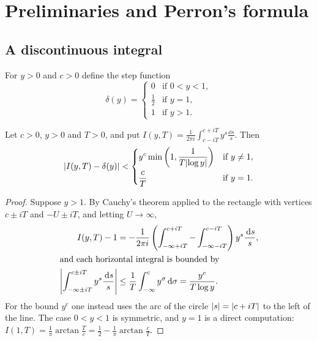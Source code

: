 \section{Preliminaries and Perron's formula}\label{sec:prelim}

\subsection{A discontinuous integral}
For $y>0$ and $c>0$ define the step function
\begin{equation}\label{eq:delta}
\delta(y) = \begin{cases}
 0 & \text{if } 0<y<1,\\
 \tfrac12 & \text{if } y=1,\\
 1 & \text{if } y>1.
\end{cases}
\end{equation}

\begin{lemma}\label{lem:discont}
Let $c>0$, $y>0$ and $T>0$, and put
$I(y,T)=\frac{1}{2\pi i}\int_{c-iT}^{c+iT} y^{s}\frac{\dd s}{s}$. Then
\begin{equation}\label{eq:discont}
\abs{I(y,T)-\delta(y)} <
\begin{dcases}
 y^{c}\min\left(1,\frac{1}{T\abs{\log y}}\right) & \text{if } y\ne1,\\
 \frac{c}{T} & \text{if } y=1.
\end{dcases}
\end{equation}
\end{lemma}

\begin{proof}
Suppose $y>1$. By Cauchy's theorem applied to the rectangle with vertices $c\pm iT$ and
$-U\pm iT$, and letting $U\to\infty$,
\begin{align}
I(y,T) - 1 &= -\frac{1}{2\pi i}\left(\int_{-\infty+iT}^{c+iT} - \int_{-\infty-iT}^{c-iT}\right)y^{s}\frac{\dd s}{s}, \label{eq:rect}\\
\intertext{and each horizontal integral is bounded by}
\abs*{\int_{-\infty\pm iT}^{c\pm iT} y^{s}\frac{\dd s}{s}} &\le \frac{1}{T}\int_{-\infty}^{c} y^{\sigma}\dd\sigma
 = \frac{y^{c}}{T\log y}. \nonumber
\end{align}
For the bound $y^c$ one instead uses the arc of the circle $\abs{s}=\abs{c+iT}$ to the left of
the line. The case $0<y<1$ is symmetric, and $y=1$ is a direct computation:
$I(1,T)=\frac{1}{\pi}\arctan\frac{T}{c}=\frac12-\frac{1}{\pi}\arctan\frac{c}{T}$.
\end{proof}

